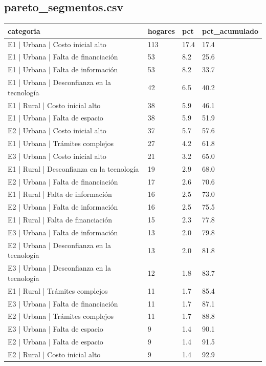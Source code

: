 \subsection*{pareto\_segmentos.csv}
{\footnotesize\begin{longtable}{@{}p{}lll@{}}
\toprule
categoria & hogares & pct & pct\_acumulado \\
\midrule\endhead
E1 | Urbana | Costo inicial alto & 113 & 17.4 & 17.4 \\
E1 | Urbana | Falta de financiación & 53 & 8.2 & 25.6 \\
E1 | Urbana | Falta de información & 53 & 8.2 & 33.7 \\
E1 | Urbana | Desconfianza en la tecnología & 42 & 6.5 & 40.2 \\
E1 | Rural | Costo inicial alto & 38 & 5.9 & 46.1 \\
E1 | Urbana | Falta de espacio & 38 & 5.9 & 51.9 \\
E2 | Urbana | Costo inicial alto & 37 & 5.7 & 57.6 \\
E1 | Urbana | Trámites complejos & 27 & 4.2 & 61.8 \\
E3 | Urbana | Costo inicial alto & 21 & 3.2 & 65.0 \\
E1 | Rural | Desconfianza en la tecnología & 19 & 2.9 & 68.0 \\
E2 | Urbana | Falta de financiación & 17 & 2.6 & 70.6 \\
E1 | Rural | Falta de información & 16 & 2.5 & 73.0 \\
E2 | Urbana | Falta de información & 16 & 2.5 & 75.5 \\
E1 | Rural | Falta de financiación & 15 & 2.3 & 77.8 \\
E3 | Urbana | Falta de información & 13 & 2.0 & 79.8 \\
E2 | Urbana | Desconfianza en la tecnología & 13 & 2.0 & 81.8 \\
E3 | Urbana | Desconfianza en la tecnología & 12 & 1.8 & 83.7 \\
E1 | Rural | Trámites complejos & 11 & 1.7 & 85.4 \\
E3 | Urbana | Falta de financiación & 11 & 1.7 & 87.1 \\
E2 | Urbana | Trámites complejos & 11 & 1.7 & 88.8 \\
E3 | Urbana | Falta de espacio & 9 & 1.4 & 90.1 \\
E2 | Urbana | Falta de espacio & 9 & 1.4 & 91.5 \\
E2 | Rural | Costo inicial alto & 9 & 1.4 & 92.9 \\

\end{longtable}}
